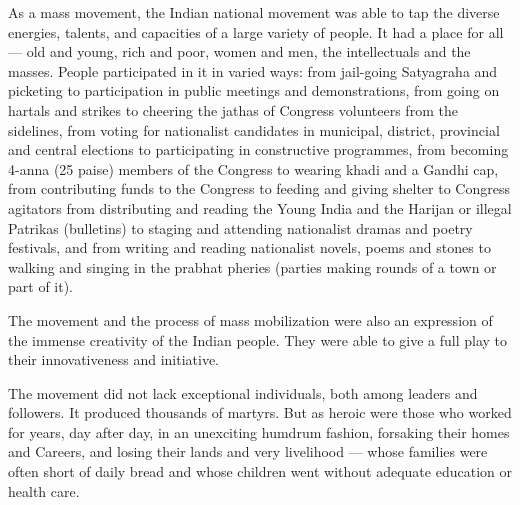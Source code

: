 As a mass movement, the Indian national movement was able to tap the diverse energies, talents, and capacities of a large variety of people. It had a place for all --- old and young, rich and poor, women and men, the intellectuals and the masses. People participated in it in varied ways: from jail-going Satyagraha and picketing to participation in public meetings and demonstrations, from going on hartals and strikes to cheering the jathas of Congress volunteers from the sidelines, from voting for nationalist candidates in municipal, district, provincial and central elections to participating in constructive programmes, from becoming 4-anna (25 paise) members of the Congress to wearing khadi and a Gandhi cap, from contributing funds to the Congress to feeding and giving shelter to Congress agitators from distributing and reading the Young India and the Harijan or illegal Patrikas (bulletins) to staging and attending nationalist dramas and poetry festivals, and from writing and reading nationalist novels, poems and stones to walking and singing in the prabhat pheries (parties making rounds of a town or part of it).

The movement and the process of mass mobilization were also an expression of the immense creativity of the Indian people. They were able to give a full play to their innovativeness and initiative.

The movement did not lack exceptional individuals, both among leaders and followers. It produced thousands of martyrs. But as heroic were those who worked for years, day after day, in an unexciting humdrum fashion, forsaking their homes and Careers, and losing their lands and very livelihood --- whose families were often short of daily bread and whose children went without adequate education or health care.
